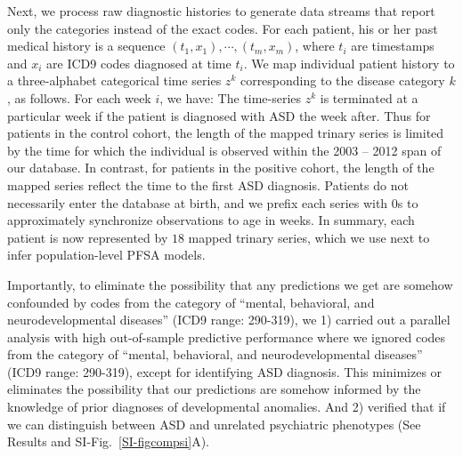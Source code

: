 \documentclass[onecolumn,,10pt]{IEEEtran}
\def\treatment{positive\xspace}
\begin{document}
Next, we process raw diagnostic histories to generate data streams that report only the categories instead of the exact codes. For each patient, his or her  past  medical history is a sequence $(t_1,x_1),\cdots,(t_m,x_m)$, where $t_i$ are timestamps and $x_i$ are ICD9 codes diagnosed at time $t_i$.  We map individual patient history to a three-alphabet categorical time series $z^k$ corresponding to the disease category $k$,  as follows. For each week $i$, we have: 
\noindent
                  The time-series $z^k$ is terminated at a particular week if the patient is diagnosed with ASD the week after. Thus for patients in the control cohort, the length of the mapped trinary series is limited by the time for which the individual is observed within the  2003 -- 2012 span of our database. In contrast, for patients in  the \treatment cohort, the length of the mapped series reflect the time to the first ASD diagnosis. Patients do not necessarily enter the database at birth, and we prefix each series with 0s to  approximately synchronize observations to age in weeks. 
In summary, each patient is now represented by $18$ mapped trinary series, which we  use next  to infer population-level PFSA models. 

Importantly, to eliminate the possibility that any predictions we get are somehow confounded by codes from 
the  category of  ``mental, behavioral, and neurodevelopmental diseases'' (ICD9 range: 290-319), we  1) carried out a parallel analysis with high out-of-sample predictive performance where we ignored codes from the category of  ``mental, behavioral, and neurodevelopmental diseases'' (ICD9 range: 290-319), except for identifying ASD diagnosis. This minimizes or eliminates the possibility that our predictions are somehow informed by the knowledge of prior diagnoses of developmental anomalies.  And 2) verified that if we  can distinguish between ASD and  unrelated psychiatric phenotypes (See Results and SI-Fig.~\ref{SI-figcompsi}A). 
                  
\end{document}
